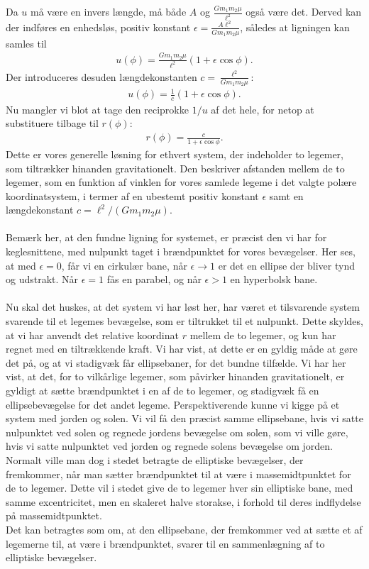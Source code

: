 Da $u$ må være en invers længde, må både $A$ og $\frac{Gm_1m_2 \mu}{\ell ^2}$ også være det. Derved kan der indføres en enhedsløs, positiv konstant $\epsilon = \frac{A \ell ^2}{G m_1 m_2 \mu}$, således at ligningen kan samles til
\begin{align}
	u(\phi) = \frac{G m_1 m_2 \mu}{\ell ^2} \left(1 + \epsilon \cos \phi \right).
\end{align}
Der introduceres desuden længdekonstanten $c = \frac{\ell ^2}{G m_1 m_2 \mu}$:
\begin{align}
	u(\phi) = \frac{1}{c}(1 + \epsilon \cos \phi).
\end{align}
Nu mangler vi blot at tage den reciprokke $1/u$ af det hele, for netop at substituere tilbage til $r(\phi)$:
\begin{align} \label{eq:r(phi)}
	r(\phi) = \frac{c}{1 + \epsilon \cos \phi}.
\end{align}
Dette er vores generelle løsning for ethvert system, der indeholder to legemer, som tiltrækker hinanden gravitationelt. Den beskriver afstanden mellem de to legemer, som en funktion af vinklen for vores samlede legeme i det valgte polære koordinatsystem, i termer af en ubestemt positiv konstant $\epsilon$ samt en længdekonstant $c = \ell ^2 /(Gm_1m_2\mu)$. \\ \\
%
%
Bemærk her, at den fundne ligning for systemet, er præcist den vi har for keglesnittene, med nulpunkt taget i brændpunktet for vores bevægelser. Her ses, at med $\epsilon = 0$, får vi en cirkulær bane, når $\epsilon \rightarrow 1$ er det en ellipse der bliver tynd og udstrakt. Når $\epsilon = 1$ fås en parabel, og når $\epsilon > 1$ en hyperbolsk bane. \\ \\
%
%
Nu skal det huskes, at det system vi har løst her, har været et tilsvarende system svarende til et legemes bevægelse, som er tiltrukket til et nulpunkt. Dette skyldes, at vi har anvendt det relative koordinat $r$ mellem de to legemer, og kun har regnet med en tiltrækkende kraft. Vi har vist, at dette er en gyldig måde at gøre det på, og at vi stadigvæk får ellipsebaner, for det bundne tilfælde. Vi har her vist, at det, for to vilkårlige legemer, som påvirker hinanden gravitationelt, er gyldigt at sætte brændpunktet i en af de to legemer, og stadigvæk få en ellipsebevægelse for det andet legeme. Perspektiverende kunne vi kigge på et system med jorden og solen. Vi vil få den præcist samme ellipsebane, hvis vi satte nulpunktet ved solen og regnede jordens bevægelse om solen, som vi ville gøre, hvis vi satte nulpunktet ved jorden og regnede solens bevægelse om jorden. \\
%
Normalt ville man dog i stedet betragte de elliptiske bevægelser, der fremkommer, når man sætter brændpunktet til at være i massemidtpunktet for de to legemer. Dette vil i stedet give de to legemer hver sin elliptiske bane, med samme excentricitet, men en skaleret halve storakse, i forhold til deres indflydelse på massemidtpunktet. \\
%
Det kan betragtes som om, at den ellipsebane, der fremkommer ved at sætte et af legemerne til, at være i brændpunktet, svarer til en sammenlægning af to elliptiske bevægelser.


